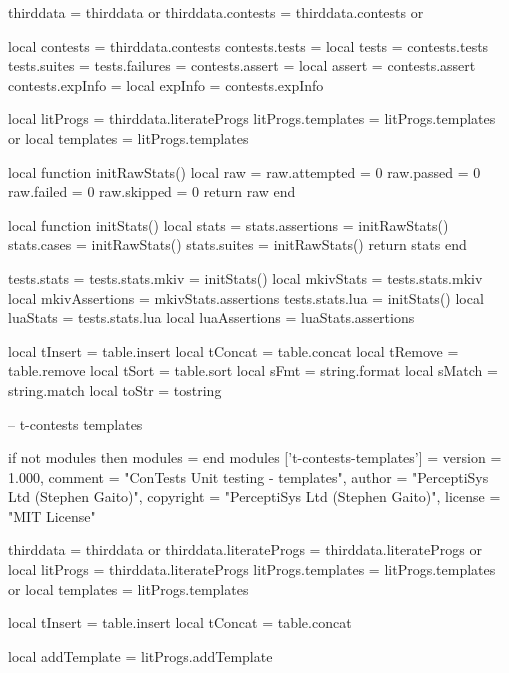 thirddata          = thirddata          or {}
thirddata.contests = thirddata.contests or {}

local contests   = thirddata.contests
contests.tests   = {}
local tests      = contests.tests
tests.suites     = {}
tests.failures   = {}
contests.assert  = {}
local assert     = contests.assert
contests.expInfo = {}
local expInfo    = contests.expInfo

local litProgs     = thirddata.literateProgs
litProgs.templates = litProgs.templates or {}
local templates    = litProgs.templates

local function initRawStats()
  local raw = {}
  raw.attempted  = 0
  raw.passed     = 0
  raw.failed     = 0
  raw.skipped    = 0
  return raw
end

local function initStats()
  local stats = {}
  stats.assertions = initRawStats()
  stats.cases      = initRawStats()
  stats.suites     = initRawStats()
  return stats
end

tests.stats          = {}
tests.stats.mkiv     = initStats()
local mkivStats      = tests.stats.mkiv
local mkivAssertions = mkivStats.assertions
tests.stats.lua      = initStats()
local luaStats       = tests.stats.lua
local luaAssertions  = luaStats.assertions

local tInsert = table.insert
local tConcat = table.concat
local tRemove = table.remove
local tSort   = table.sort
local sFmt    = string.format
local sMatch  = string.match
local toStr   = tostring
\stopLuaCode

\startLuaTemplate
-- t-contests templates

if not modules then modules = { } end
modules ['t-contests-templates'] = {
    version   = 1.000,
    comment   = "ConTests Unit testing - templates",
    author    = "PerceptiSys Ltd (Stephen Gaito)",
    copyright = "PerceptiSys Ltd (Stephen Gaito)",
    license   = "MIT License"
}

thirddata               = thirddata               or {}
thirddata.literateProgs = thirddata.literateProgs or {}
local litProgs          = thirddata.literateProgs
litProgs.templates      = litProgs.templates      or {}
local templates         = litProgs.templates

local tInsert = table.insert
local tConcat = table.concat

local addTemplate = litProgs.addTemplate
\stopLuaTemplate

\stopchapter